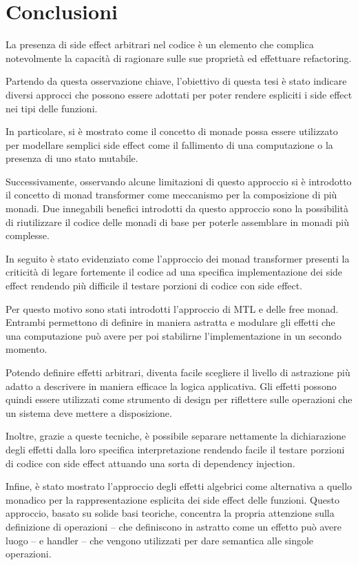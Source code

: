 \chapter{Conclusioni}

La presenza di side effect arbitrari nel codice è un elemento che complica notevolmente la capacità di ragionare sulle sue proprietà ed effettuare refactoring.

Partendo da questa osservazione chiave, l'obiettivo di questa tesi è stato indicare diversi approcci che possono essere adottati per poter rendere espliciti i side effect nei tipi delle funzioni.

In particolare, si è mostrato come il concetto di monade possa essere utilizzato per modellare semplici side effect come il fallimento di una computazione o la presenza di uno stato mutabile.

Successivamente, osservando alcune limitazioni di questo approccio si è introdotto il concetto di monad transformer come meccanismo per la composizione di più monadi.
Due innegabili benefici introdotti da questo approccio sono la possibilità di riutilizzare il codice delle monadi di base per poterle assemblare in monadi più complesse.

In seguito è stato evidenziato come l'approccio dei monad transformer presenti la criticità di legare fortemente il codice ad una specifica implementazione dei side effect rendendo più difficile il testare porzioni di codice con side effect.

Per questo motivo sono stati introdotti l'approccio di MTL e delle free monad.
Entrambi permettono di definire in maniera astratta e modulare gli effetti che una computazione può avere per poi stabilirne l'implementazione in un secondo momento.

Potendo definire effetti arbitrari, diventa facile scegliere il livello di astrazione più adatto a descrivere in maniera efficace la logica applicativa.
Gli effetti possono quindi essere utilizzati come strumento di design per riflettere sulle operazioni che un sistema deve mettere a disposizione.

Inoltre, grazie a queste tecniche, è possibile separare nettamente la dichiarazione degli effetti dalla loro specifica interpretazione rendendo facile il testare porzioni di codice con side effect attuando una sorta di dependency injection.

Infine, è stato mostrato l'approccio degli effetti algebrici come alternativa a quello monadico per la rappresentazione esplicita dei side effect delle funzioni.
Questo approccio, basato su solide basi teoriche, concentra la propria attenzione sulla definizione di operazioni -- che definiscono in astratto come un effetto può avere luogo -- e handler -- che vengono utilizzati per dare semantica alle singole operazioni.

